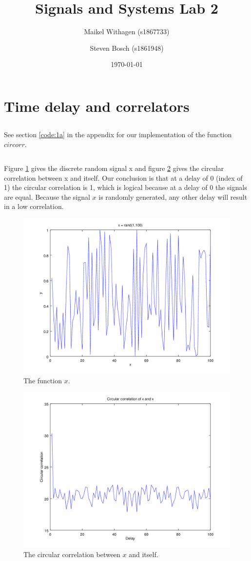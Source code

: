 \documentclass{article}
\title{Signals and Systems Lab 2}
\author{Maikel Withagen (s1867733) \and Steven Bosch (s1861948)}
\date{\today}
\begin{document}
\maketitle

\section{Time delay and correlators}
\subsection{}
See section \ref{code:1a} in the appendix for our implementation of the function $circorr$.

\subsection{}
Figure \ref{fig:1b1} gives the discrete random signal x and figure \ref{fig:1b2} gives the circular correlation between x and itself. Our conclusion is that at a delay of 0 (index of 1) the circular correlation is 1, which is logical because at a delay of 0 the signals are equal. Because the signal $x$ is randomly generated, any other delay will result in a low correlation.
\begin{figure}[H]
	\centering
	\includegraphics[width=.7\textwidth]{plot1b1.png}
	\caption{The function $x$.}
	\label{fig:1b1}
\end{figure}
\begin{figure}[H]
	\centering
	\includegraphics[width=.7\textwidth]{plot1b2.png}
	\caption{The circular correlation between $x$ and itself.}
	\label{fig:1b2}
\end{figure}
\end{document}
